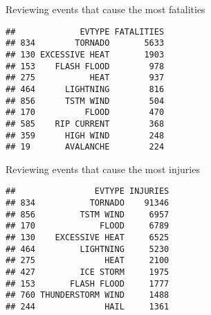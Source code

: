 \documentclass[
]{article}
\newenvironment{Shaded}{\begin{snugshade}}{\end{snugshade}}
\newcommand{\DataTypeTok}[1]{\textcolor[rgb]{0.13,0.29,0.53}{#1}}
\newcommand{\DecValTok}[1]{\textcolor[rgb]{0.00,0.00,0.81}{#1}}
\newcommand{\KeywordTok}[1]{\textcolor[rgb]{0.13,0.29,0.53}{\textbf{#1}}}
\newcommand{\NormalTok}[1]{#1}
\newcommand{\OperatorTok}[1]{\textcolor[rgb]{0.81,0.36,0.00}{\textbf{#1}}}
\newcommand{\StringTok}[1]{\textcolor[rgb]{0.31,0.60,0.02}{#1}}
\begin{document}
Reviewing events that cause the most fatalities

\begin{Shaded}
\end{Shaded}

\begin{verbatim}
##             EVTYPE FATALITIES
## 834        TORNADO       5633
## 130 EXCESSIVE HEAT       1903
## 153    FLASH FLOOD        978
## 275           HEAT        937
## 464      LIGHTNING        816
## 856      TSTM WIND        504
## 170          FLOOD        470
## 585    RIP CURRENT        368
## 359      HIGH WIND        248
## 19       AVALANCHE        224
\end{verbatim}

Reviewing events that cause the most injuries

\begin{Shaded}
\end{Shaded}

\begin{verbatim}
##                EVTYPE INJURIES
## 834           TORNADO    91346
## 856         TSTM WIND     6957
## 170             FLOOD     6789
## 130    EXCESSIVE HEAT     6525
## 464         LIGHTNING     5230
## 275              HEAT     2100
## 427         ICE STORM     1975
## 153       FLASH FLOOD     1777
## 760 THUNDERSTORM WIND     1488
## 244              HAIL     1361
\end{verbatim}
\end{document}
